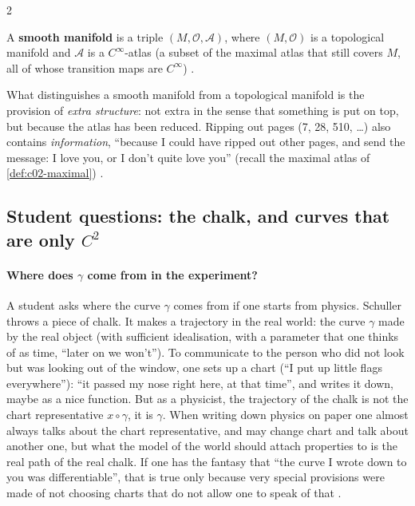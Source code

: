 \begin{paracol}{2}
\begin{definition}\label{def:c04-smooth}
A \textbf{smooth manifold} is a triple $(M,\mathcal O,\mathcal A)$, where $(M,\mathcal O)$ is a topological manifold and $\mathcal A$ is a $C^\infty$-atlas (a subset of the maximal atlas that still covers $M$, all of whose transition maps are $C^\infty$)
.
\end{definition}
What distinguishes a smooth manifold from a topological manifold is the provision of \emph{extra structure}: not extra in the sense that something is put on top, but because the atlas has been reduced. Ripping out pages (7, 28, 510, \dots) also contains \emph{information}, ``because I could have ripped out other pages, and send the message: I love you, or I don't quite love you''
(recall the maximal atlas of \cref{def:c02-maximal}) .

\subsection{Student questions: the chalk, and curves that are only $C^2$}

\paragraph{Where does $\gamma$ come from in the experiment?} A student asks where the curve $\gamma$ comes from if one starts from physics. Schuller throws a piece of chalk. It makes a trajectory in the real world: the curve $\gamma$ made by the real object (with sufficient idealisation, with a parameter that one thinks of as time, ``later on we won't'').
To communicate to the person who did not look but was looking out of the window, one sets up a chart (``I put up little flags everywhere''): ``it passed my nose right here, at that time'', and writes it down, maybe as a nice function. But as a physicist, the trajectory of the chalk is not the chart representative $x\circ\gamma$, it is $\gamma$.
When writing down physics on paper one almost always talks about the chart representative, and may change chart and talk about another one, but what the model of the world should attach properties to is the real path of the real chalk. If one has the fantasy that ``the curve I wrote down to you was differentiable'', that is true
only because very special provisions were made of not choosing charts that do not allow one to speak of that .


\end{paracol}
